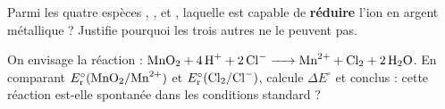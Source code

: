 \documentclass[11pt,a4paper]{article}
\newcommand{\Ered}{\ensuremath{E_{\mathrm{r}}^{\circ}}}
\newcounter{exo}
\begin{document}
\begin{exo}
Parmi les quatre espèces , ,  et , laquelle est capable de
\textbf{réduire} l'ion  en argent métallique  ? Justifie pourquoi les trois autres ne
le peuvent pas.
\end{exo}

\begin{exo}
On envisage la réaction : $\ce{MnO2 + 4 H+ + 2 Cl^- -> Mn^{2+} + Cl2 + 2 H2O}$.
En comparant $\Ered(\ce{MnO2}/\ce{Mn^{2+}})$ et $\Ered(\ce{Cl2}/\ce{Cl^-})$, calcule $\Delta E^{\circ}$
et conclus : cette réaction est-elle spontanée dans les conditions standard ?
\end{exo}
\end{document}
